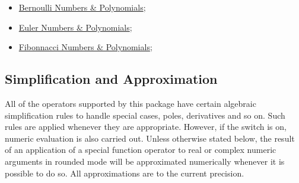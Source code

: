 \begin{itemize}
\item \hyperlink{BERNOULLIP}{Bernoulli Numbers \& Polynomials};
\item \hyperlink{EULERP}{Euler  Numbers \& Polynomials};
\item \hyperlink{FIBONACCIP}{Fibonnacci  Numbers \& Polynomials};
\end{itemize}

\subsection{Simplification and Approximation}

All of the operators supported by this package have certain algebraic
simplification rules to handle special cases, poles, derivatives and so
on.  Such rules are applied whenever they are appropriate.  However, if
the  switch is on, numeric evaluation is also carried out.
Unless otherwise stated below, the result of an application of a special
function operator to real or complex numeric arguments in rounded mode
will be approximated numerically whenever it is possible to do so.  All
approximations are to the current precision.

